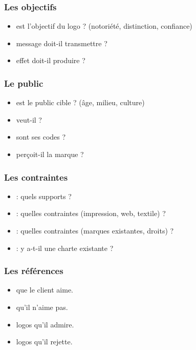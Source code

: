 \subsubsection{Les objectifs}

\begin{itemize}
    \item {} est l'objectif du logo ? (notoriété, distinction, confiance)
    \item {} message doit-il transmettre ?
    \item {} effet doit-il produire ?
\end{itemize}

\subsubsection{Le public}

\begin{itemize}
    \item {} est le public cible ? (âge, milieu, culture)
    \item {} veut-il ?
    \item {} sont ses codes ?
    \item {} perçoit-il la marque ?
\end{itemize}

\subsubsection{Les contraintes}

\begin{itemize}
    \item {} : quels supports ?
    \item {} : quelles contraintes (impression, web, textile) ?
    \item {} : quelles contraintes (marques existantes, droits) ?
    \item {} : y a-t-il une charte existante ?
\end{itemize}

\subsubsection{Les références}

\begin{itemize}
    \item {} que le client aime.
    \item {} qu'il n'aime pas.
    \item {} logos qu'il admire.
    \item {} logos qu'il rejette.
\end{itemize}


